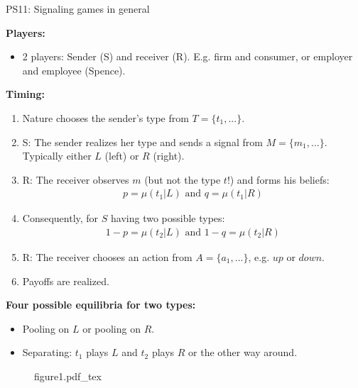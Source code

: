 \begin{frame}{PS11: Signaling games in general}
    \begin{multicols}{2}
      \textbf{Players:}\vspace{-8pt}
      \begin{itemize}
        \item 2 players: Sender (S) and receiver (R). E.g. firm and consumer, or employer and employee (Spence).
      \end{itemize}\vspace{-6pt}
      \textbf{Timing:}\vspace{-8pt}
      \begin{enumerate}
        \item Nature chooses the sender's type from $T=\{t_1,...\}$.
        \item S: The sender realizes her type and sends a signal from $M=\{m_1,...\}$. Typically either $L$ (left) or $R$ (right).
        \item R: The receiver observes $m$ (but not the type $t$!) and forms his beliefs:\vspace{-5pt}
        \begin{align*}
          p=\mu(t_1|L)\text{ and }q=\mu(t_1|R)
        \end{align*}
        \item[] \vspace{-4pt} Consequently, for $S$ having two possible types:\vspace{-5pt}
        \begin{align*}
          1-p=\mu(t_2|L)\text{ and }1-q=\mu(t_2|R)
        \end{align*}
        \item \vspace{-4pt} R: The receiver chooses an action from $A=\{a_1,...\}$, e.g. $up$ or $down$.
        \item Payoffs are realized.
      \end{enumerate}\vspace{-6pt}
      \textbf{Four possible equilibria for two types:}\vspace{-6pt}
      \begin{itemize}
        \item Pooling on $L$ or pooling on $R$.
        \item Separating: $t_1$ plays $L$ and $t_2$ plays $R$ or the other way around.
      \end{itemize}
      \vfill\null\columnbreak
      \begin{figure}[!h]
        \center
        \def\svgwidth{\columnwidth}
        {figure1.pdf_tex}
      \end{figure}
      \vfill\null
    \end{multicols}
\end{frame}

